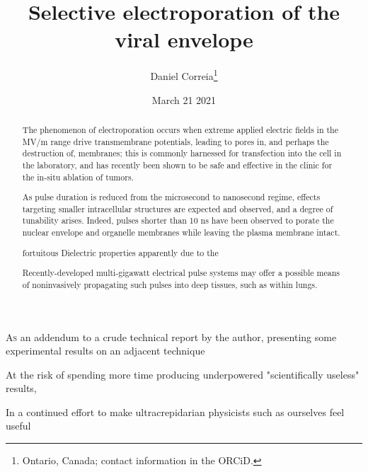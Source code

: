 \documentclass[fleqn,10pt]{paper}
\begin{document}
\title{Selective electroporation of the viral envelope}
\author{\footnotesize{Daniel Correia}\footnote{Ontario, Canada; contact information in the ORCiD.}}
\date{\small{March 21 2021}}

\flushbottom 
\maketitle



\thispagestyle{empty}

\renewcommand{\abstractname}{Summary}    %

\begin{abstract}
	\noindent The phenomenon of electroporation occurs when extreme applied electric fields in the MV/m range drive transmembrane potentials, leading to pores in, and perhaps the destruction of, membranes; this is commonly harnessed for transfection into the cell in the laboratory, and has recently been shown to be safe and effective in the clinic for the in-situ ablation of tumors.
	
	\noindent As pulse duration is reduced from the microsecond to nanosecond regime, effects targeting smaller intracellular structures are expected and observed, and a degree of tunability arises. Indeed, pulses shorter than 10 ns have been observed to porate the nuclear envelope and organelle membranes while leaving the plasma membrane intact.
	
	fortuitous Dielectric properties apparently due to the 
	
	\noindent Recently-developed multi-gigawatt electrical pulse systems may offer a possible means of noninvasively propagating such pulses into deep tissues, such as within lungs. 
\end{abstract}

\lettrine{A}{s} an addendum to a crude technical report \cite{notes2021} by the author, presenting some experimental results on an adjacent technique

At the risk of spending more time producing underpowered "scientifically useless" results, 

In a continued effort to make ultracrepidarian physicists such as ourselves feel useful 
\end{document}
